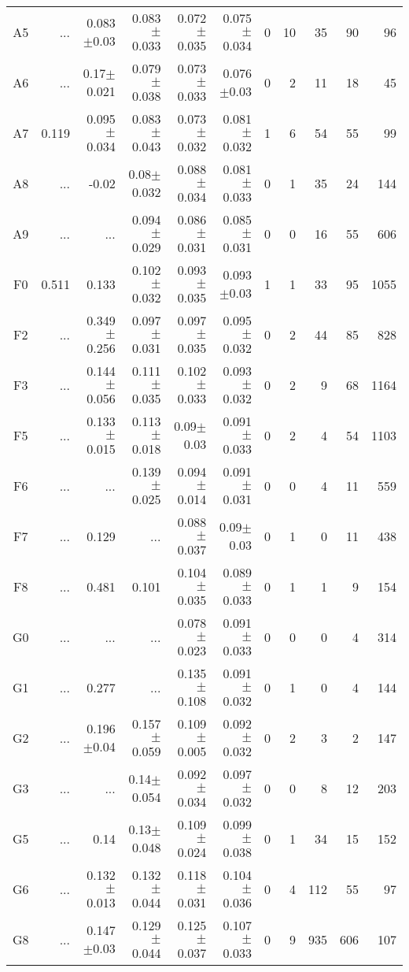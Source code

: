 \begin{table}[t]
\begin{center}
\begin{tabular}{c|rrrrr|rrrrr}
A5	&	 ...	&	0.083$\pm$0.03	&	0.083$\pm$0.033	&	0.072$\pm$0.035	&	0.075$\pm$0.034	&	0	&	10	&	35	&	90	&	96	\\
A6	&	 ...	&	0.17$\pm$0.021	&	0.079$\pm$0.038	&	0.073$\pm$0.033	&	0.076$\pm$0.03	&	0	&	2	&	11	&	18	&	45	\\
A7	&	0.119	&	0.095$\pm$0.034	&	0.083$\pm$0.043	&	0.073$\pm$0.032	&	0.081$\pm$0.032	&	1	&	6	&	54	&	55	&	99	\\
A8	&	 ...	&	-0.02	&	0.08$\pm$0.032	&	0.088$\pm$0.034	&	0.081$\pm$0.033	&	0	&	1	&	35	&	24	&	144	\\
A9	&	 ...	&	 ...	&	0.094$\pm$0.029	&	0.086$\pm$0.031	&	0.085$\pm$0.031	&	0	&	0	&	16	&	55	&	606	\\
F0	&	0.511	&	0.133	&	0.102$\pm$0.032	&	0.093$\pm$0.035	&	0.093$\pm$0.03	&	1	&	1	&	33	&	95	&	1055	\\
F2	&	 ...	&	0.349$\pm$0.256	&	0.097$\pm$0.031	&	0.097$\pm$0.035	&	0.095$\pm$0.032	&	0	&	2	&	44	&	85	&	828	\\
F3	&	 ...	&	0.144$\pm$0.056	&	0.111$\pm$0.035	&	0.102$\pm$0.033	&	0.093$\pm$0.032	&	0	&	2	&	9	&	68	&	1164	\\
F5	&	 ...	&	0.133$\pm$0.015	&	0.113$\pm$0.018	&	0.09$\pm$0.03	&	0.091$\pm$0.033	&	0	&	2	&	4	&	54	&	1103	\\
F6	&	 ...	&	 ...	&	0.139$\pm$0.025	&	0.094$\pm$0.014	&	0.091$\pm$0.031	&	0	&	0	&	4	&	11	&	559	\\
F7	&	 ...	&	0.129	&	 ...	&	0.088$\pm$0.037	&	0.09$\pm$0.03	&	0	&	1	&	0	&	11	&	438	\\
F8	&	 ...	&	0.481	&	0.101	&	0.104$\pm$0.035	&	0.089$\pm$0.033	&	0	&	1	&	1	&	9	&	154	\\
G0	&	 ...	&	 ...	&	 ...	&	0.078$\pm$0.023	&	0.091$\pm$0.033	&	0	&	0	&	0	&	4	&	314	\\
G1	&	 ...	&	0.277	&	 ...	&	0.135$\pm$0.108	&	0.091$\pm$0.032	&	0	&	1	&	0	&	4	&	144	\\
G2	&	 ...	&	0.196$\pm$0.04	&	0.157$\pm$0.059	&	0.109$\pm$0.005	&	0.092$\pm$0.032	&	0	&	2	&	3	&	2	&	147	\\
G3	&	 ...	&	 ...	&	0.14$\pm$0.054	&	0.092$\pm$0.034	&	0.097$\pm$0.032	&	0	&	0	&	8	&	12	&	203	\\
G5	&	 ...	&	0.14	&	0.13$\pm$0.048	&	0.109$\pm$0.024	&	0.099$\pm$0.038	&	0	&	1	&	34	&	15	&	152	\\
G6	&	 ...	&	0.132$\pm$0.013	&	0.132$\pm$0.044	&	0.118$\pm$0.031	&	0.104$\pm$0.036	&	0	&	4	&	112	&	55	&	97	\\
G8	&	 ...	&	0.147$\pm$0.03	&	0.129$\pm$0.044	&	0.125$\pm$0.037	&	0.107$\pm$0.033	&	0	&	9	&	935	&	606	&	107	\\

\end{tabular}
\end{center}
\end{table}
